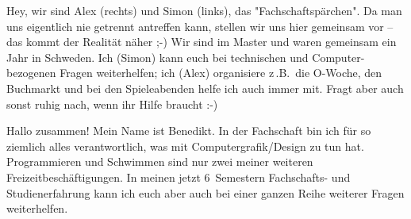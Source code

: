 \begin{multicols*}{2}

{%

Hey,
wir sind Alex (rechts) und Simon (links), das "Fachschaftspärchen".
Da man uns eigentlich nie getrennt antreffen kann, stellen wir uns hier 
gemeinsam vor – das kommt der Realität näher ;-)
Wir sind im Master und waren gemeinsam ein Jahr in Schweden.
Ich (Simon) kann euch bei technischen und Computer-bezogenen Fragen weiterhelfen; ich (Alex) organisiere z\,.B.\ die O-Woche, den Buchmarkt und bei den Spieleabenden helfe ich auch immer mit.
Fragt aber auch sonst ruhig nach, wenn ihr Hilfe braucht :-)
}
	
{Hallo zusammen! Mein Name ist Benedikt. In der Fachschaft bin ich für so ziemlich alles verantwortlich, was mit Computergrafik/Design zu tun hat. Programmieren und Schwimmen sind nur zwei meiner weiteren Freizeitbeschäftigungen. In meinen jetzt 6~Semestern Fachschafts- und Studienerfahrung kann ich euch aber auch bei einer ganzen Reihe weiterer Fragen weiterhelfen.}


\end{multicols*}
